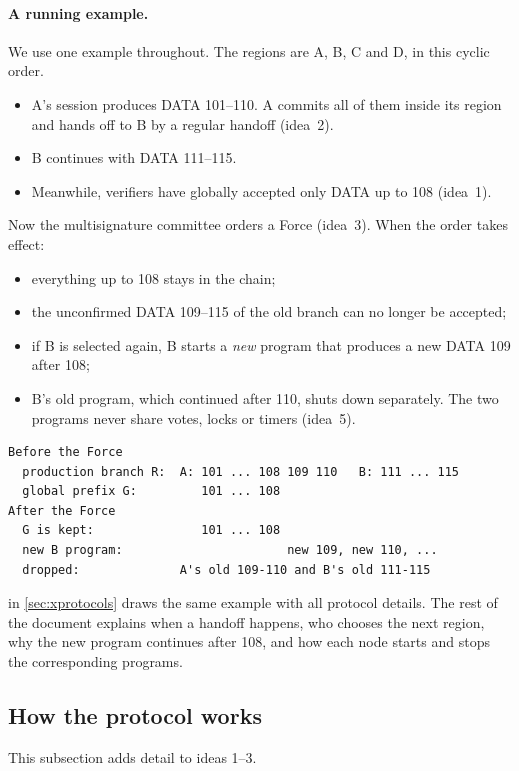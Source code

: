 \documentclass[11pt,a4paper]{article}
\newcounter{protocol}
\begin{document}
\paragraph{A running example.}
We use one example throughout. The regions are A, B, C and D, in this
cyclic order.
\begin{itemize}
\item A's session produces DATA 101--110. A commits all of them inside
its region and hands off to B by a regular handoff (idea~2).
\item B continues with DATA 111--115.
\item Meanwhile, verifiers have globally accepted only DATA up to 108
(idea~1).
\end{itemize}
Now the multisignature committee orders a Force (idea~3). When the order
takes effect:
\begin{itemize}
\item everything up to 108 stays in the chain;
\item the unconfirmed DATA 109--115 of the old branch can no longer be
accepted;
\item if B is selected again, B starts a \emph{new} program that produces
a new DATA 109 after 108;
\item B's old program, which continued after 110, shuts down separately.
The two programs never share votes, locks or timers (idea~5).
\end{itemize}
\begin{center}\small
\begin{verbatim}
Before the Force
  production branch R:  A: 101 ... 108 109 110   B: 111 ... 115
  global prefix G:         101 ... 108
After the Force
  G is kept:               101 ... 108
  new B program:                       new 109, new 110, ...
  dropped:              A's old 109-110 and B's old 111-115
\end{verbatim}
\end{center}
 in \cref{sec:xprotocols} draws the same
example with all protocol details. The rest of the document explains when
a handoff happens, who chooses the next region, why the new program
continues after 108, and how each node starts and stops the
corresponding programs.

\subsection{How the protocol works}
This subsection adds detail to ideas 1--3.
\end{document}
